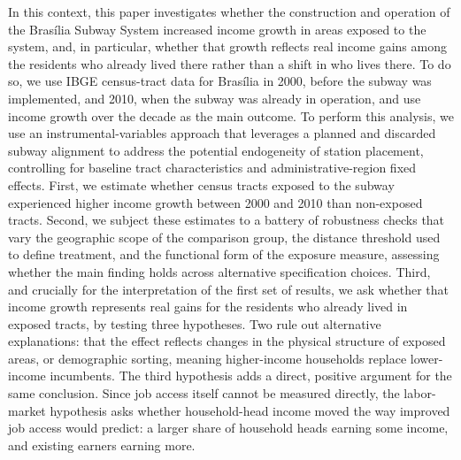 In this context, this paper investigates whether the construction and operation of the Brasília Subway System increased income growth in areas exposed to the system, and, in particular, whether that growth reflects real income gains among the residents who already lived there rather than a shift in who lives there. To do so, we use IBGE census-tract data for Brasília in 2000, before the subway was implemented, and 2010, when the subway was already in operation, and use income growth over the decade as the main outcome. To perform this analysis, we use an instrumental-variables approach that leverages a planned and discarded subway alignment to address the potential endogeneity of station placement, controlling for baseline tract characteristics and administrative-region fixed effects. First, we estimate whether census tracts exposed to the subway experienced higher income growth between 2000 and 2010 than non-exposed tracts. Second, we subject these estimates to a battery of robustness checks that vary the geographic scope of the comparison group, the distance threshold used to define treatment, and the functional form of the exposure measure, assessing whether the main finding holds across alternative specification choices. Third, and crucially for the interpretation of the first set of results, we ask whether that income growth represents real gains for the residents who already lived in exposed tracts, by testing three hypotheses. Two rule out alternative explanations: that the effect reflects changes in the physical structure of exposed areas, or demographic sorting, meaning higher-income households replace lower-income incumbents. The third hypothesis adds a direct, positive argument for the same conclusion. Since job access itself cannot be measured directly, the labor-market hypothesis asks whether household-head income moved the way improved job access would predict: a larger share of household heads earning some income, and existing earners earning more.

